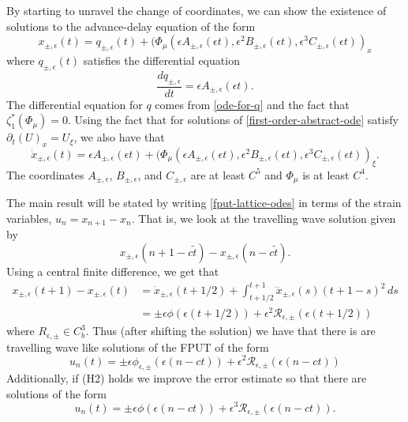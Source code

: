By starting to unravel the change of coordinates, we can show the existence of solutions to the advance-delay equation of the form
\begin{equation}
	x_{\pm,\epsilon}(t) = q_{\pm, \epsilon}(t) + (\Phi_\mu(\epsilon A_{\pm, \epsilon}(\epsilon t),\epsilon^2 B_{\pm, \epsilon}(\epsilon t) ,\epsilon^3 C_{\pm, \epsilon}(\epsilon t))_x
\end{equation}
where \(q_{\pm, \epsilon}(t)\) satisfies the differential equation
\begin{equation}
	\frac{dq_{\pm, \epsilon}}{dt} =  \epsilon A_{\pm, \epsilon}(\epsilon t).
\end{equation}
The differential equation for \(q\) comes from \cref{ode-for-q} and the fact that \(\zeta_1^*(\Phi_\mu) = 0\). Using the fact that for solutions of \cref{first-order-abstract-ode} satisfy \(\partial_t (U)_x = U_\xi\), we also have that
\begin{equation}
	\dot x_{\pm, \epsilon}(t) =  \epsilon A_{\pm, \epsilon}(\epsilon t) + (\Phi_\mu(\epsilon A_{\pm, \epsilon}(\epsilon t),\epsilon^2 B_{\pm, \epsilon}(\epsilon t) ,\epsilon^3 C_{\pm, \epsilon}(\epsilon t))_\xi.
\end{equation}
The coordinates \(A_{\pm, \epsilon}\), \(B_{\pm, \epsilon}\), and  \(C_{\pm, \epsilon}\) are at least \(C^5\) and \(\Phi_\mu\) is at least \(C^4\).

The main result will be stated by writing \cref{fput-lattice-odes} in terms of the strain variables, \(u_n = x_{n+1} - x_n\). That is, we look at the travelling wave solution given by 
\begin{equation}
	x_{\pm, \epsilon}(n+1-c\tilde t) - x_{\pm, \epsilon}(n-c\tilde t).
\end{equation}
Using a central finite difference, we get that 
\begin{equation}
\begin{aligned}
	x_{\pm, \epsilon}(t+1) - x_{\pm, \epsilon}(t) &= \dot x_{\pm, \epsilon}(t+ 1/2) + \int_{t+1/2}^{t+1} \dddot{x}_{\pm, \epsilon}(s) (t+1 -s)^2\, ds \\
	 &= \pm \epsilon \phi(\epsilon (t+1/2)) + \epsilon^2 \mathcal R_{\epsilon, \pm}(\epsilon (t+1/2))
\end{aligned}
\end{equation}
where \(R_{\epsilon, \pm} \in C^3_b\). Thus (after shifting the solution) we have that there is are travelling wave like solutions of the FPUT of the form
\begin{equation}
	u_n(t) = \pm \epsilon \phi_{\epsilon, \pm}(\epsilon(n-ct)) + \epsilon^2 \mathcal R_{\epsilon, \pm}(\epsilon (n-ct))
\end{equation}
Additionally, if (H2) holds we improve the error estimate so that there are solutions of the form 
\begin{equation}
	u_n(t) = \pm \epsilon \phi(\epsilon(n-ct)) + \epsilon^3 \mathcal R_{\epsilon, \pm}(\epsilon (n-ct)).
\end{equation}

